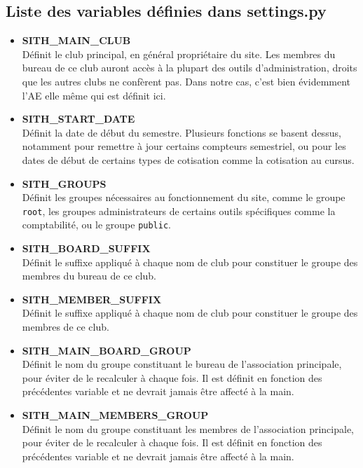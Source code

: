 \documentclass[a4paper]{report}
\begin{document}
\subsection{Liste des variables définies dans \textbf{settings.py}}
\label{sub:liste_des_variables_d_finies_dans_settings.py}
\begin{itemize}
    \item \textbf{SITH\_MAIN\_CLUB} \\
        Définit le club principal, en général propriétaire du site. Les membres du bureau de ce club auront accès à la
        plupart des outils d'administration, droits que les autres clubs ne confèrent pas. Dans notre cas, c'est bien
        évidemment l'AE elle même qui est définit ici.
    \item \textbf{SITH\_START\_DATE} \\
        Définit la date de début du semestre. Plusieurs fonctions se basent dessus, notamment pour remettre à jour
        certains compteurs semestriel, ou pour les dates de début de certains types de cotisation comme la cotisation au
        cursus.
    \item \textbf{SITH\_GROUPS} \\
        Définit les groupes nécessaires au fonctionnement du site, comme le groupe \verb#root#, les groupes
        administrateurs de certains outils spécifiques comme la comptabilité, ou le groupe \verb#public#.
    \item \textbf{SITH\_BOARD\_SUFFIX} \\
        Définit le suffixe appliqué à chaque nom de club pour constituer le groupe des membres du bureau de ce club.
    \item \textbf{SITH\_MEMBER\_SUFFIX} \\
        Définit le suffixe appliqué à chaque nom de club pour constituer le groupe des membres de ce club.
    \item \textbf{SITH\_MAIN\_BOARD\_GROUP} \\
        Définit le nom du groupe constituant le bureau de l'association principale, pour éviter de le recalculer à
        chaque fois. Il est définit en fonction des précédentes variable et ne devrait jamais être affecté à la main.
    \item \textbf{SITH\_MAIN\_MEMBERS\_GROUP} \\
        Définit le nom du groupe constituant les membres de l'association principale, pour éviter de le recalculer à
        chaque fois. Il est définit en fonction des précédentes variable et ne devrait jamais être affecté à la main.

\end{itemize}
\end{document}
